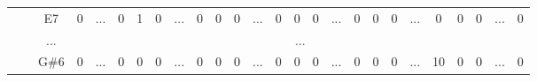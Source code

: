 \documentclass[12pt]{article}
\begin{document}
\begin{table}[!ht]
{\begin{tabular}{clcccccccccccccccccccccccc}
									& \multicolumn{1}{l|}{} & \multicolumn{1}{c|}{E7}   & \multicolumn{1}{c|}{0}    & \multicolumn{1}{c|}{...}                  & \multicolumn{1}{c|}{0}    & \multicolumn{1}{c|}{1}    & \multicolumn{1}{c|}{0}  & \multicolumn{1}{c|}{...}                  & \multicolumn{1}{c|}{0}  & \multicolumn{1}{c|}{0}  & \multicolumn{1}{c|}{0}  & \multicolumn{1}{c|}{...}                  & \multicolumn{1}{c|}{0}    & \multicolumn{1}{c|}{0}    & \multicolumn{1}{c|}{0}    & \multicolumn{1}{c|}{...}                  & \multicolumn{1}{c|}{0}  & \multicolumn{1}{c|}{0}  & \multicolumn{1}{c|}{0}    & \multicolumn{1}{c|}{...}                  & \multicolumn{1}{c|}{0}    & \multicolumn{1}{c|}{0}    & \multicolumn{1}{c|}{0}  & \multicolumn{1}{c|}{...}                  & \multicolumn{1}{c|}{0}  \\ \cline{3-4} \cline{6-8} \cline{10-12} \cline{14-16} \cline{18-20} \cline{22-24} \cline{26-26} 
									& \multicolumn{1}{l|}{} & \multicolumn{1}{c|}{...}  & \multicolumn{23}{c|}{...}                                                                                                                                                                                                                                                                                                                                                                                                                                                                                                                                                                                                                                                                                                                         \\ \cline{3-4} \cline{6-8} \cline{10-12} \cline{14-16} \cline{18-20} \cline{22-24} \cline{26-26} 
									& \multicolumn{1}{l|}{} & \multicolumn{1}{c|}{G\#6} & \multicolumn{1}{c|}{0}    & \multicolumn{1}{c|}{\multirow{3}{*}{...}} & \multicolumn{1}{c|}{0}    & \multicolumn{1}{c|}{0}    & \multicolumn{1}{c|}{0}  & \multicolumn{1}{c|}{\multirow{3}{*}{...}} & \multicolumn{1}{c|}{0}  & \multicolumn{1}{c|}{0}  & \multicolumn{1}{c|}{0}  & \multicolumn{1}{c|}{\multirow{3}{*}{...}} & \multicolumn{1}{c|}{0}    & \multicolumn{1}{c|}{0}    & \multicolumn{1}{c|}{0}    & \multicolumn{1}{c|}{\multirow{3}{*}{...}} & \multicolumn{1}{c|}{0}  & \multicolumn{1}{c|}{0}  & \multicolumn{1}{c|}{0}    & \multicolumn{1}{c|}{\multirow{3}{*}{...}} & \multicolumn{1}{c|}{10}   & \multicolumn{1}{c|}{0}    & \multicolumn{1}{c|}{0}  & \multicolumn{1}{c|}{\multirow{3}{*}{...}} & \multicolumn{1}{c|}{0}  \\ \cline{3-4} \cline{6-8} \cline{10-12} \cline{14-16} \cline{18-20} \cline{22-24} \cline{26-26} 

\end{tabular}}
\end{table}
\end{document}
